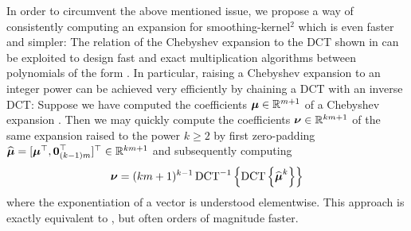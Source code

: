 In order to circumvent the above mentioned issue, we propose a way of consistently computing
an expansion for \gls{smoothing-kernel}$^2$ which is even faster and simpler:
The relation of the Chebyshev expansion to the \gls{DCT} shown in 
can be exploited to design fast and exact multiplication algorithms between polynomials
of the form  \cite[Proposition~3.1]{baszenski1997cosine}.
In particular, raising a Chebyshev expansion to an integer power can be achieved
very efficiently by chaining a \gls{DCT} with an inverse \gls{DCT}:
Suppose we have computed the coefficients $\boldsymbol{\mu} \in \mathbb{R}^{m+1}$
of a Chebyshev expansion .
Then we may quickly compute the coefficients $\boldsymbol{\nu} \in \mathbb{R}^{km+1}$
of the same expansion raised to the power $k \geq 2$ by first zero-padding
$\widehat{\boldsymbol{\mu}} = [\boldsymbol{\mu}^{\top}, \boldsymbol{0}_{(k-1)m}^{\top}]^{\top} \in \mathbb{R}^{km+1}$
and subsequently computing
\begin{equation}
    \boldsymbol{\nu} = (km + 1)^{k - 1} \operatorname{DCT}^{-1}\left\{ \operatorname{DCT}\left\{\widehat{\boldsymbol{\mu}}^{k}\right\} \right\}
    \label{equ:3-nystrom-chebyshev-potentiate-coefficients}
\end{equation}
where the exponentiation of a vector is understood elementwise.
This approach is exactly equivalent to \cite[Algorithm~5]{lin2017randomized}, but
often orders of magnitude faster.\\

